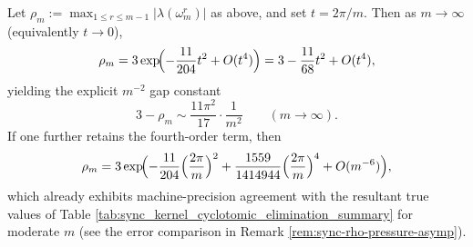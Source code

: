 \begin{corollary}\label{cor:sync-rho-gap-m2}
Let \(\rho_m:=\max_{1\le r\le m-1}|\lambda(\omega_m^r)|\) as above, and set \(t=2\pi/m\).
Then as \(m\to\infty\) (equivalently \(t\to 0\)),
\[
\rho_m
=3\exp\!\Bigl(-\frac{11}{204}t^2+O(t^4)\Bigr)
=3-\frac{11}{68}t^2+O(t^4),
\]
yielding the explicit \(m^{-2}\) gap constant
\[
\boxed{\;
3-\rho_m\sim \frac{11\pi^2}{17}\cdot\frac{1}{m^2}\qquad(m\to\infty).
\;}
\]
If one further retains the fourth-order term, then
\[
\rho_m
=3\exp\!\Bigl(-\frac{11}{204}\Bigl(\frac{2\pi}{m}\Bigr)^2+\frac{1559}{1414944}\Bigl(\frac{2\pi}{m}\Bigr)^4+O(m^{-6})\Bigr),
\]
which already exhibits machine-precision agreement with the resultant true values of Table \ref{tab:sync_kernel_cyclotomic_elimination_summary} for moderate \(m\) (see the error comparison in Remark \ref{rem:sync-rho-pressure-asymp}).
\end{corollary}

